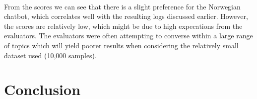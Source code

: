 \documentclass{article}
\begin{document}
\paragraph{}
From the scores we can see that there is a slight preference for the Norwegian
chatbot, which correlates well with the resulting logs discussed earlier.
However, the scores are relatively low, which might be due to high expecations
from the evaluators. The evaluators were often attempting to converse within
a large range of topics which will yield poorer results when considering the
relatively small dataset used (10,000 samples).

\section*{Conclusion}


\printbibliography
\end{document}
